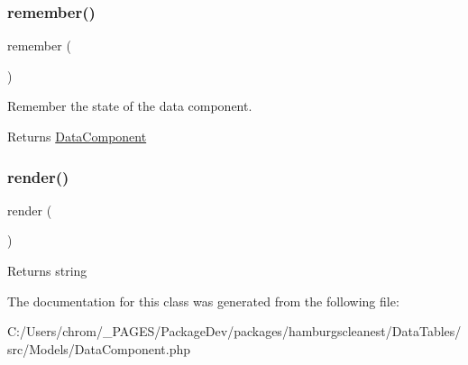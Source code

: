 \subsubsection{\texorpdfstring{remember()}{remember()}}
{\footnotesize\ttfamily remember (\begin{DoxyParamCaption}{ }\end{DoxyParamCaption})}

Remember the state of the data component.

\begin{DoxyReturn}{Returns}
\hyperlink{classhamburgscleanest_1_1_data_tables_1_1_models_1_1_data_component}{Data\+Component} 
\end{DoxyReturn}
\mbox{\label{classhamburgscleanest_1_1_data_tables_1_1_models_1_1_data_component_afde88292c44dc59faf017738dae6dffb}} 
\subsubsection{\texorpdfstring{render()}{render()}}
{\footnotesize\ttfamily render (\begin{DoxyParamCaption}{ }\end{DoxyParamCaption})\hspace{0.3cm}{\ttfamily [abstract]}}

\begin{DoxyReturn}{Returns}
string 
\end{DoxyReturn}


The documentation for this class was generated from the following file\+:\begin{DoxyCompactItemize}
\item 
C\+:/\+Users/chrom/\+\_\+\+P\+A\+G\+E\+S/\+Package\+Dev/packages/hamburgscleanest/\+Data\+Tables/src/\+Models/Data\+Component.\+php\end{DoxyCompactItemize}
